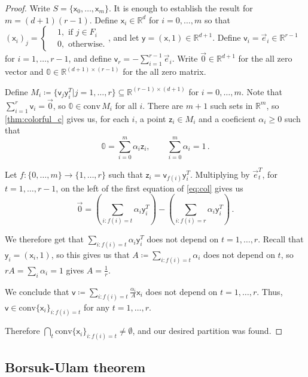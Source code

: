 \documentclass[12pt]{amsart}
\theoremstyle{definition}
\newcommand{\R}{\mathbb{R}}
\newcommand{\vv}{\mathsf{v}}
\newcommand{\vx}{\mathsf{x}}
\newcommand{\vy}{\mathsf{y}}
\newcommand{\vz}{\mathsf{z}}
\newcommand{\conv}{\mathrm{conv}}
\begin{document}
\begin{proof}
Write $S = \{\vx_0, \ldots, \vx_m\}$.
It is enough to establish the result for $m = (d+1)(r-1)$.
Define $\vx_i \in \R^{d}$ for $i = 0, \ldots, m$ so that $(\vx_i)_j = \begin{cases}&1, \text{ if $j \in F_i$ } \\  &0, \text{ otherwise.}\end{cases}$, and let $\vy = (\vx, 1) \in \R^{d+1}$.
Define $\vv_i = \vec{e}_i \in\R^{r-1}$ for $i = 1, \ldots, r-1$, and define $\vv_r = - \sum_{i=1}^{r-1} \vec{e}_i$.
Write $\vec{0} \in\R^{d+1}$ for the all zero vector and $\mathbb{0} \in \R^{(d+1)\times (r-1)}$ for the all zero matrix.

Define $M_i \coloneqq \{\vv_j\vy^T_i | j=1, \ldots, r \} \subseteq \R^{(r-1) \times (d+1)}$ for $i = 0, \ldots, m$.
Note that $\sum_{i=1}^r \vv_i = \vec{0}$, so $\mathbb{0} \in \conv \, M_i$ for all $i$.
There are $m+1$ such sets in $\R^m$, so \cref{thm:colorful_c} gives us, for each $i$, a point $\vz_i\in M_i$ and a coeficient $\alpha_i\geq 0$ such that 
\begin{equation}\label{eq:col}
 \mathbb{0} = \sum_{i=0}^m \alpha_i \vz_i , \quad \quad \sum_{i=0}^m \alpha_i = 1\, . 
\end{equation}

Let $f:\{0, \ldots, m\} \to \{1, \ldots, r\}$ such that $\vz_i = \vv_{f(i)}\vy_i^T$.
Multiplying by $\vec{e}_t^T$, for $t = 1, \ldots, r-1$, on the left of the first equation of \eqref{eq:col} gives us 
$$ \vec{0} = \left( \sum_{i: f(i) = t} \alpha_i \vy_i^T\right) - \left(\sum_{i: f(i) = r} \alpha_i \vy_i^T \right) \, . $$

We therefore get that $ \sum_{i: f(i) = t} \alpha_i \vy_i^T$ does not depend on $t = 1, \ldots, r$.
Recall that $\vy_i = (\vx_i, 1)$, so this gives us that $A \coloneqq  \sum_{i: f(i) = t} \alpha_i$ does not depend on $t$, so $r A = \sum_i \alpha_i = 1$ gives $A = \frac{1}{r}$.

We conclude that $\vv \coloneqq \sum_{i: f(i) = t} \frac{\alpha_i}{A}\vx_i$ does not depend on $t=1, \ldots, r$.
Thus, $\vv \in \conv\{\vx_i\}_{i: f(i) = t}$ for any $t=1, \ldots, r$.

Therefore $\bigcap_t \conv\{\vx_i\}_{i: f(i) = t}\neq \emptyset$, and our desired partition was found.
\end{proof}

\subsection{Borsuk-Ulam theorem}
\end{document}
